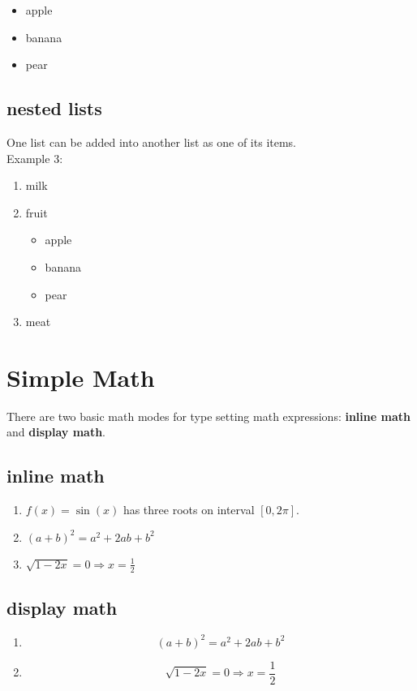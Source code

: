 \documentclass{article}
\begin{document}
\begin{itemize}
\item apple
\item banana
\item pear
\end{itemize}

\subsection{nested lists}
One list can be added into another list as one of its items.\\

\noindent Example 3:
\begin{enumerate}
\item milk
\item fruit
	\begin{itemize}
	\item apple
	\item banana
	\item pear
	\end{itemize}
\item meat
\end{enumerate}



\section{Simple Math}
There are two basic math modes for type setting math expressions: \textbf{inline math} and \textbf{display math}. %
\subsection{inline math} %

\begin{enumerate}
\item
$f(x)=\sin(x)$ has three roots on interval $[0,2\pi]$.
\item
$ (a+b)^2=a^2+2ab+b^2 $
\item
\(   \sqrt{1-2x}=0 \Rightarrow x=\frac{1}{2}   \)
\end{enumerate}

\subsection{display math} %

\begin{enumerate}

\item
$$(a+b)^2=a^2+2ab+b^2$$
\item
\[
\sqrt{1-2x}=0 \Rightarrow x=\frac{1}{2}
\]
\end{enumerate}
\end{document}
